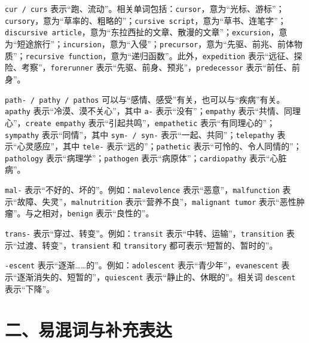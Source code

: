 \documentclass[UTF8,zihao=-4]{ctexart}
\begin{document}
\texttt{cur / curs} 表示“跑、流动”。相关单词包括：\texttt{cursor}，意为“光标、游标”；\texttt{cursory}，意为“草率的、粗略的”；\texttt{cursive script}，意为“草书、连笔字”；\texttt{discursive article}，意为“东拉西扯的文章、散漫的文章”；\texttt{excursion}，意为“短途旅行”；\texttt{incursion}，意为“入侵”；\texttt{precursor}，意为“先驱、前兆、前体物质”；\texttt{recursive function}，意为“递归函数”。此外，\texttt{expedition} 表示“远征、探险、考察”，\texttt{forerunner} 表示“先驱、前身、预兆”，\texttt{predecessor} 表示“前任、前身”。

\texttt{path- / pathy / pathos} 可以与“感情、感受”有关，也可以与“疾病”有关。\texttt{apathy} 表示“冷漠、漠不关心”，其中 \texttt{a-} 表示“没有”；\texttt{empathy} 表示“共情、同理心”，\texttt{create empathy} 表示“引起共鸣”，\texttt{empathetic} 表示“有同理心的”；\texttt{sympathy} 表示“同情”，其中 \texttt{sym- / syn-} 表示“一起、共同”；\texttt{telepathy} 表示“心灵感应”，其中 \texttt{tele-} 表示“远的”；\texttt{pathetic} 表示“可怜的、令人同情的”；\texttt{pathology} 表示“病理学”；\texttt{pathogen} 表示“病原体”；\texttt{cardiopathy} 表示“心脏病”。

\texttt{mal-} 表示“不好的、坏的”。例如：\texttt{malevolence} 表示“恶意”，\texttt{malfunction} 表示“故障、失灵”，\texttt{malnutrition} 表示“营养不良”，\texttt{malignant tumor} 表示“恶性肿瘤”。与之相对，\texttt{benign} 表示“良性的”。

\texttt{trans-} 表示“穿过、转变”。例如：\texttt{transit} 表示“中转、运输”，\texttt{transition} 表示“过渡、转变”，\texttt{transient} 和 \texttt{transitory} 都可表示“短暂的、暂时的”。

\texttt{-escent} 表示“逐渐……的”。例如：\texttt{adolescent} 表示“青少年”，\texttt{evanescent} 表示“逐渐消失的、短暂的”，\texttt{quiescent} 表示“静止的、休眠的”。相关词 \texttt{descent} 表示“下降”。

\section*{二、易混词与补充表达}
\end{document}
